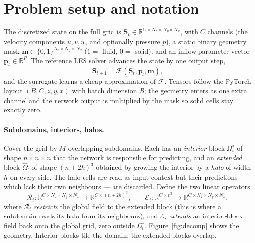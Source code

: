 \documentclass[11pt]{article}
\newcommand{\R}{\mathbb{R}}
\newcommand{\Rop}{\mathcal{R}}
\newcommand{\Eop}{\mathcal{E}}
\newcommand{\F}{\mathcal{F}}
\begin{document}
\section{Problem setup and notation}\label{sec:notation}

The discretized state on the full grid is
$\bm S_t\in\R^{C\times N_z\times N_y\times N_x}$, with $C$ channels (the velocity
components $u,v,w$, and optionally pressure $p$), a static binary geometry mask
$\bm m\in\{0,1\}^{N_z\times N_y\times N_x}$ ($1=$ fluid, $0=$ solid), and an inflow
parameter vector $\bm p_t\in\R^{P}$. The reference LES solver advances the state by
one output step,
\begin{equation}
\bm S_{t+1}=\F(\bm S_t,\bm p_t,\bm m),
\label{eq:truth}
\end{equation}
and the surrogate learns a cheap approximation of $\F$. Tensors follow the PyTorch
layout $(B,C,z,y,x)$ with batch dimension $B$; the geometry enters as one extra
channel and the network output is multiplied by the mask so solid cells stay
exactly zero.

\paragraph{Subdomains, interiors, halos.}
Cover the grid by $M$ overlapping subdomains. Each has an \emph{interior} block
$\Omega_i^\circ$ of shape $n\times n\times n$ that the network is responsible for
predicting, and an \emph{extended} block $\hat\Omega_i$ of shape $(n+2h)^3$ obtained
by growing the interior by a \emph{halo} of width $h$ on every side. The halo cells
are read as input context but their predictions --- which lack their own neighbours
--- are discarded. Define the two linear operators
\begin{equation}
\Rop_i:\R^{C\times N_z\times N_y\times N_x}\to\R^{C\times(n+2h)^3},
\qquad
\Eop_i:\R^{C\times n^3}\to\R^{C\times N_z\times N_y\times N_x},
\label{eq:restrict-extend}
\end{equation}
where $\Rop_i$ \emph{restricts} the global field to the extended block (this is
where a subdomain reads its halo from its neighbours), and $\Eop_i$ \emph{extends}
an interior-block field back onto the global grid, zero outside $\Omega_i^\circ$.
Figure~\ref{fig:decomp} shows the geometry. Interior blocks tile the domain; the
extended blocks overlap.
\end{document}
